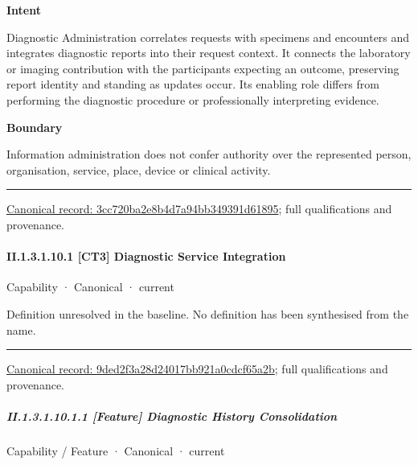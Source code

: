 \textbf{Intent}



Diagnostic Administration correlates requests with specimens and encounters and integrates diagnostic reports into their request context. It connects the laboratory or imaging contribution with the participants expecting an outcome, preserving report identity and standing as updates occur. Its enabling role differs from performing the diagnostic procedure or professionally interpreting evidence.



\textbf{Boundary}



Information administration does not confer authority over the represented person, organisation, service, place, device or clinical activity.



\medskip\hrule\medskip

{\footnotesize \href{../../../../continuum/strategy/capability/3cc720ba2e8b4d7a94bb349391d61895.md}{Canonical record: 3cc720ba2e8b4d7a94bb349391d61895}; full qualifications and provenance.}\par
\paragraph*{II.1.3.1.10.1 [CT3] Diagnostic Service Integration}
\label{navigation:II.1.3.1.10.1}

\label{element:9ded2f3a28d24017bb921a0cdcf65a2b}
{\small Capability · Canonical · current}\par

Definition unresolved in the baseline. No definition has been synthesised from the name.



\medskip\hrule\medskip

{\footnotesize \href{../../../../continuum/strategy/capability/9ded2f3a28d24017bb921a0cdcf65a2b.md}{Canonical record: 9ded2f3a28d24017bb921a0cdcf65a2b}; full qualifications and provenance.}\par
\subparagraph*{II.1.3.1.10.1.1 [Feature] Diagnostic History Consolidation}
\label{navigation:II.1.3.1.10.1.1}

\label{element:0b3fa0b7374842ff8ce199191a3479bd}
{\small Capability / Feature · Canonical · current}\par

